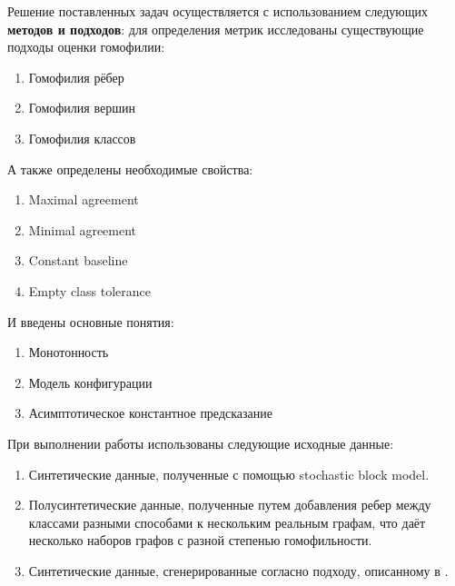 \documentclass[a4paper,14pt]{article}
\begin{document}
	Решение поставленных задач осуществляется с использованием следующих \textbf{методов и подходов}: для определения метрик исследованы существующие подходы оценки гомофилии:
	
	\begin{enumerate}
		\item Гомофилия рёбер
		
		\item Гомофилия вершин
		
		\item Гомофилия классов
	\end{enumerate}

	А также определены необходимые свойства: 
	
	\begin{enumerate}
		\item Maximal agreement
		
		\item Minimal agreement
		
		\item Constant baseline
		
		\item Empty class tolerance
	\end{enumerate}
	
	И введены основные понятия:
	
	\begin{enumerate}
		\item Монотонность
		
		\item Модель конфигурации
		
		\item Асимптотическое константное предсказание
	\end{enumerate}
	
	При выполнении работы использованы следующие исходные данные:
	
	\begin{enumerate}
		\item Синтетические данные, полученные с помощью stochastic block model.
		
		\item Полусинтетические данные, полученные путем добавления ребер между классами разными способами к нескольким реальным графам, что даёт несколько наборов графов с разной степенью гомофильности.
	
		\item Синтетические данные, сгенерированные согласно подходу, описанному в \cite{luan2021heterophily}.
	\end{enumerate}
	
\end{document}
